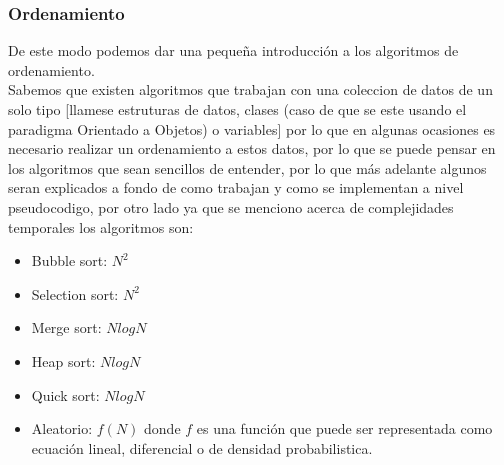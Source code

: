 \documentclass[10pt,executivepaper]{article}
\begin{document}
\subsubsection{Ordenamiento}
De este modo podemos dar una pequeña introducción a los algoritmos de ordenamiento.\\
Sabemos que existen algoritmos que trabajan con una coleccion de datos de un solo tipo [llamese estruturas de datos, clases (caso de que se este usando el paradigma Orientado a Objetos) o variables] por lo que en algunas ocasiones es necesario realizar un ordenamiento a estos datos, por lo que se puede pensar en los algoritmos que sean sencillos de entender, por lo que más adelante algunos seran explicados a fondo de como trabajan y como se implementan a nivel pseudocodigo, por otro lado ya que se menciono acerca de complejidades temporales los algoritmos son:
\begin{itemize}
  \item Bubble sort: $N^2$
  \item Selection sort: $N^2$
  \item Merge sort: $N log N$
  \item Heap sort: $N log N$
  \item Quick sort: $N log N$
  \item Aleatorio: $f(N)$ donde $f$ es una función que puede ser representada como ecuación lineal, diferencial o de densidad probabilistica.
\end{itemize}
\end{document}
